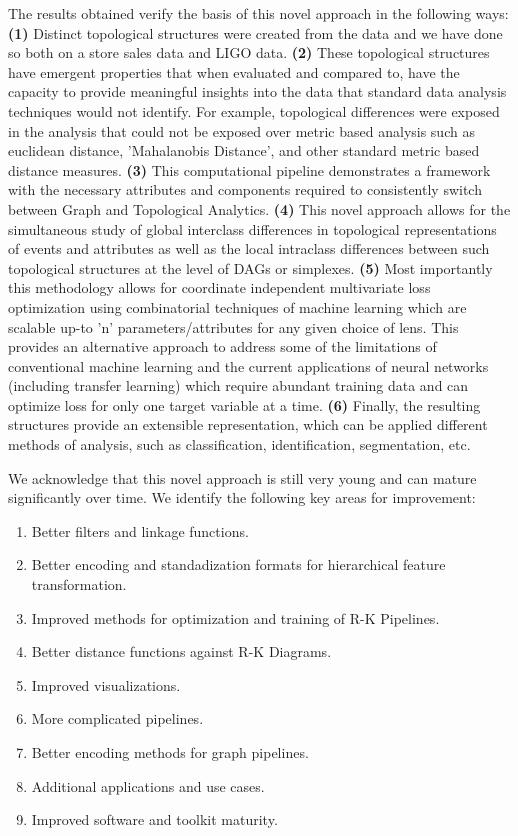 The results obtained verify the basis of this novel approach in the following ways: \textbf{(1)} Distinct topological structures were created from the data and we have done so both on a store sales data and LIGO data. \textbf{(2)} These topological structures have emergent properties that when evaluated and compared to, have the capacity to provide meaningful insights into the data that standard data analysis techniques would not identify. For example, topological differences were exposed in the analysis that could not be exposed over metric based analysis such as euclidean distance, 'Mahalanobis Distance', and other standard metric based distance measures. \textbf{(3)} This computational pipeline demonstrates a framework with the necessary attributes and components required to consistently switch between Graph and Topological Analytics.  \textbf{(4)} This novel approach allows for the simultaneous study of global interclass differences in topological representations of events and attributes as well as the local intraclass differences between such topological structures at the level of DAGs or simplexes. \textbf{(5)} Most importantly this methodology allows for coordinate independent multivariate loss optimization using combinatorial techniques of machine learning which are scalable up-to 'n' parameters/attributes for any given choice of lens. This provides an alternative approach to address some of the limitations of  conventional machine learning and the current applications of neural networks (including transfer learning) which require abundant training data and can optimize loss for only one target variable at a time. \textbf{(6)} Finally, the resulting structures provide an extensible representation, which can be applied different methods of analysis, such as classification, identification, segmentation, etc.

We acknowledge that this novel approach is still very young and can mature significantly over time. We identify the following key areas for improvement:

\begin{enumerate}
    \item{Better filters and linkage functions.}
    \item{Better encoding and standadization formats for hierarchical feature transformation.}
    \item{Improved methods for optimization and training of R-K Pipelines.}
    \item{Better distance functions against R-K Diagrams.}
    \item{Improved visualizations.}
    \item{More complicated pipelines.}
    \item{Better encoding methods for graph pipelines.}
    \item{Additional applications and use cases.}
    \item{Improved software and toolkit maturity.}
\end{enumerate}

